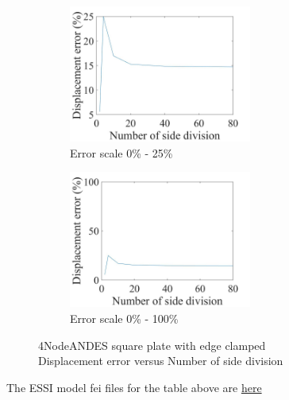 \documentclass[fleqn,11pt]{article}
\begin{document}
\begin{figure}[H]
  \begin{subfigure}{0.5\textwidth}
    \centering
    \includegraphics[width=6cm]{../Figure-files/error4andes_square_plate_clamped.jpeg}
    \caption{Error scale 0\% - 25\%}
  \end{subfigure}
  \begin{subfigure}{0.5\textwidth}
    \centering
    \includegraphics[width=6cm]{../Figure-files/error4andes_square_plate_clamped100.jpeg}
    \caption{Error scale 0\% - 100\%}
  \end{subfigure}
  \captionsetup{justification=centering,margin=2cm}
  \caption{4NodeANDES square plate with edge clamped\\
      Displacement error   versus   Number of side division}
  \label{fig 4NodeANDES square plate with edge clamped}
\end{figure}



The ESSI model fei files for the table above are \href{https://github.com/yuan-energy/ESSI_Verification/blob/master/4NodeANDES/square_plate_clamped/square_plate_clamped.tar.gz?raw=true}{here}
















\end{document}
